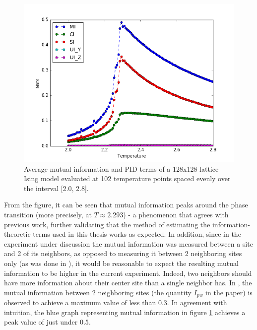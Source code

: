 \documentclass[12pt]{article}
\begin{document}
\begin{figure} [h!]
\begin{center}
\includegraphics[width=\textwidth]{ising-128-pid-2-nbs}
\caption{Average mutual information and PID terms of a 128x128 lattice Ising model evaluated at 102 temperature points spaced evenly over the interval [2.0, 2.8].}
\label{fig:ising-128-pid-2-nbs}
\end{center}
\end{figure}

From the figure, it can be seen that mutual information peaks around the phase transition (more precisely, at $T \approx 2.293$) - a phenomenon that agrees with previous work, further validating that the method of estimating the information-theoretic terms used in this thesis works as expected. In addition, since in the experiment under discussion the mutual information was measured between a site and 2 of its neighbors, as opposed to measuring it between 2 neighboring sites only (as was done in \cite{barnett-ising}), it would be reasonable to expect the resulting mutual information to be higher in the current experiment. Indeed, two neighbors should have more information about their center site than a single neighbor has. In \cite{barnett-ising}, the mutual information between 2 neighboring sites (the quantity $I_{pw}$ in the paper) is observed to achieve a maximum value of less than $0.3$. In agreement with intuition, the blue graph representing mutual information in figure \ref{fig:ising-128-pid-2-nbs} achieves a peak value of just under $0.5$.
\end{document}
